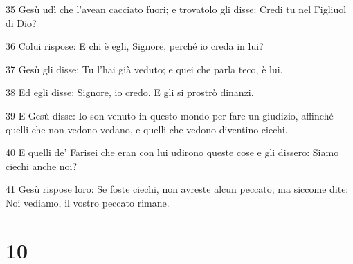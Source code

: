 \par 35 Gesù udì che l'avean cacciato fuori; e trovatolo gli disse: Credi tu nel Figliuol di Dio?
\par 36 Colui rispose: E chi è egli, Signore, perché io creda in lui?
\par 37 Gesù gli disse: Tu l'hai già veduto; e quei che parla teco, è lui.
\par 38 Ed egli disse: Signore, io credo. E gli si prostrò dinanzi.
\par 39 E Gesù disse: Io son venuto in questo mondo per fare un giudizio, affinché quelli che non vedono vedano, e quelli che vedono diventino ciechi.
\par 40 E quelli de' Farisei che eran con lui udirono queste cose e gli dissero: Siamo ciechi anche noi?
\par 41 Gesù rispose loro: Se foste ciechi, non avreste alcun peccato; ma siccome dite: Noi vediamo, il vostro peccato rimane.

\chapter{10}

